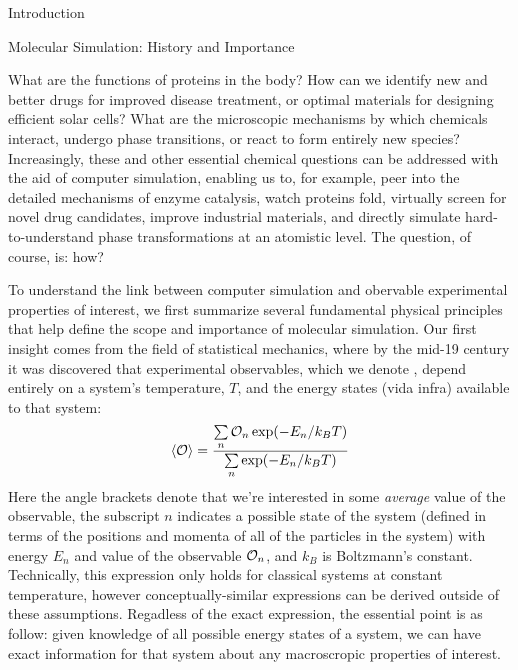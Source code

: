 \begin{chapter}{Introduction}
\label{ch:intro}


\begin{section}{Molecular Simulation: History and Importance}

What are the functions of proteins in the body? How can we identify new and better drugs for improved
disease treatment, or optimal materials for designing efficient solar cells?
What are the microscopic mechanisms by which chemicals interact, undergo phase
transitions, or react to form entirely new species? Increasingly, these and other 
essential chemical questions can be addressed with the aid of computer
simulation, 
\cite{VanGunsteren1990,Hospital2015,Chen2015,Karplus2002,Ciccotti2014}
enabling us to, for example, peer into the detailed mechanisms of enzyme catalysis,
\cite{Warshel2003}
watch proteins fold,
\cite{Levitt1975,Lane2013,Piana2014,Perez2016}
virtually screen for novel drug candidates, 
\cite{DeVivo2016}
improve industrial materials,
\cite{Jiang2011,Maurin2016,Bereau2016}
and directly simulate hard-to-understand phase transformations at an atomistic level.
\cite{Kalikmanov2013,Wilding2001}
The question, of course, is: how?


To understand the link between computer simulation and obervable experimental properties
of interest,\footnotemark{} we first summarize several fundamental
physical principles
that help define the
scope and importance of molecular simulation.
Our first insight comes from the field of
statistical mechanics, where by the mid-19 century it was discovered
that experimental observables, which we denote \obs, depend entirely on
a system's temperature, $T$, and the energy states (vida infra) available to that system:
%
\begin{align}
\label{eq:intro-boltzmann}
\braket{\mathcal{O}} = \frac{\sum\limits_n \mathcal{O}_n \exp (-E_n/k_BT)}
                    {\sum\limits_n \exp (-E_n/k_BT)}
\end{align}
%
Here the angle brackets denote that we're interested in some \emph{average}
value of the observable, the subscript $n$ indicates a possible state of the
system (defined in terms of the positions and momenta of all of the particles
in the system) with energy $E_n$ and value of the observable
$\mathcal{O}_n$, 
and $k_B$ is Boltzmann's constant.\cite{allen1989computer}
 Technically,
this expression only holds for classical systems at constant temperature,
however conceptually-similar expressions can be derived outside of these
assumptions. 
Regadless of the exact expression, the essential point is as follow:
given knowledge of all possible energy states of a system, we can
have exact information for that system about any macroscropic properties of
interest. 


\end{section}
\end{chapter}
